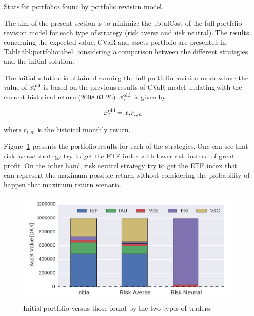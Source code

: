 \begin{table}[tp]
\caption{Stats for portfolios found by portfolio revision model.}\label{tbl:portfoliotabel}
\centering

\end{table}

The aim of the present section is to minimize the TotalCost of the full portfolio revision model for each type of strategy (risk averse and risk neutral).
The results concerning the expected value, CVaR and assets portfolio are presented in Table\ref{tbl:portfoliotabel} considering a comparison between the different strategies and the initial solution. 

The initial solution is obtained running the full portfolio revision mode where the value of $x^{\textup{old}}_{i}$  is based on the previous results of CVaR model updating with the current historical return (2008-03-26). 
$x^{\textup{old}}_{i}$  is given by

\begin{align}
x^{\textup{old}}_{i} &= x_{i} r_{i,m}
\end{align}

where $r_{i,m}$ is the histoical monthly return.

Figure~\ref{fig:prevpf} presents the portfolio results for each of the strategies.
One can see that risk averse strategy try to get the ETF index with lower risk instead of great profit.
On the other hand, risk neutral strategy try to get the ETF index that can represent the maximum possible return without considering the probability of happen that maximum return scenario.

\begin{figure}[tpbh]
\centering
\includegraphics{../pic/portfoliorevision_portfolio.pdf}
\caption{Initial portfolio versus those found by the two types of traders.}
\label{fig:prevpf}
\end{figure}

